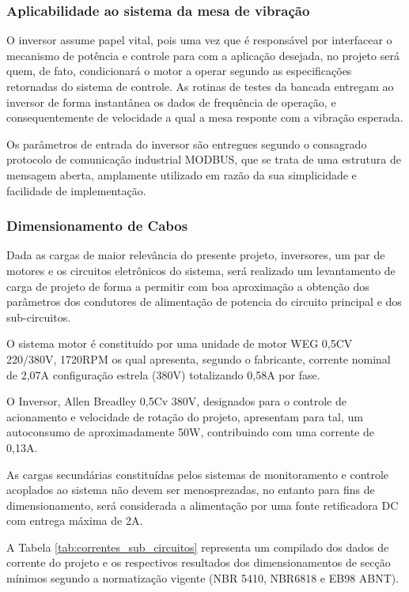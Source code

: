         

\subsubsection*{\textbf{Aplicabilidade ao sistema da mesa de vibração}}

O inversor assume papel vital, pois uma vez que é responsável por interfacear o mecanismo de potência e controle para 
com a aplicação desejada, no projeto será quem, de fato, condicionará o motor a operar segundo as especificações retornadas 
do sistema de controle. As rotinas de testes da bancada entregam ao inversor de forma instantânea os dados de frequência de 
operação, e consequentemente de velocidade a qual a mesa responte com a vibração esperada.

Os parâmetros de entrada do inversor são entregues segundo o consagrado protocolo de comunicação industrial MODBUS, que se 
trata de uma estrutura de mensagem aberta, amplamente utilizado em razão da sua simplicidade e facilidade de implementação.\\

\subsubsection*{\textbf{Dimensionamento de Cabos}}

Dada as cargas de maior relevância do presente projeto, inversores, um par de motores e os circuitos eletrônicos do sistema, 
será realizado um levantamento de carga de projeto de forma a permitir com boa aproximação a obtenção dos parâmetros dos condutores 
de alimentação de potencia do circuito principal e dos sub-circuitos.

    O sistema motor é constituído por uma unidade de motor WEG 0,5CV 220/380V, 1720RPM os qual apresenta, segundo o fabricante, 
    corrente nominal de 2,07A configuração estrela (380V) totalizando 0,58A por fase.

    O Inversor, Allen Breadley 0,5Cv 380V, designados para o controle de acionamento e velocidade de rotação do projeto, apresentam
    para tal, um autoconsumo de aproximadamente 50W, contribuindo com uma corrente de 0,13A.

    As cargas secundárias constituídas pelos sistemas de monitoramento e controle acoplados ao sistema não devem  ser menosprezadas,
    no entanto para fins de dimensionamento, será considerada a alimentação por uma fonte retificadora DC com entrega máxima de 2A.

    A Tabela \ref{tab:correntes_sub_circuitos} representa um compilado dos dados de corrente do projeto e os respectivos resultados dos dimensionamentos de
    secção mínimos segundo a normatização vigente (NBR 5410, NBR6818 e EB98 ABNT).

